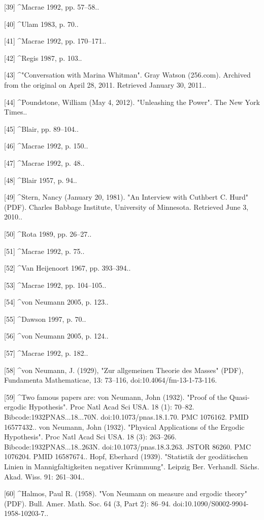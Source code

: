 [39]
^Macrae 1992, pp. 57–58..

[40]
^Ulam 1983, p. 70..

[41]
^Macrae 1992, pp. 170–171..

[42]
^Regis 1987, p. 103..

[43]
^"Conversation with Marina Whitman". Gray Watson (256.com). Archived from the original on April 28, 2011. Retrieved January 30, 2011..

[44]
^Poundstone, William (May 4, 2012). "Unleashing the Power". The New York Times..

[45]
^Blair, pp. 89–104..

[46]
^Macrae 1992, p. 150..

[47]
^Macrae 1992, p. 48..

[48]
^Blair 1957, p. 94..

[49]
^Stern, Nancy (January 20, 1981). "An Interview with Cuthbert C. Hurd" (PDF). Charles Babbage Institute, University of Minnesota. Retrieved June 3, 2010..

[50]
^Rota 1989, pp. 26–27..

[51]
^Macrae 1992, p. 75..

[52]
^Van Heijenoort 1967, pp. 393–394..

[53]
^Macrae 1992, pp. 104–105..

[54]
^von Neumann 2005, p. 123..

[55]
^Dawson 1997, p. 70..

[56]
^von Neumann 2005, p. 124..

[57]
^Macrae 1992, p. 182..

[58]
^von Neumann, J. (1929), "Zur allgemeinen Theorie des Masses" (PDF), Fundamenta Mathematicae, 13: 73–116, doi:10.4064/fm-13-1-73-116.

[59]
^Two famous papers are: von Neumann, John (1932). "Proof of the Quasi-ergodic Hypothesis". Proc Natl Acad Sci USA. 18 (1): 70–82. Bibcode:1932PNAS...18...70N. doi:10.1073/pnas.18.1.70. PMC 1076162. PMID 16577432.. von Neumann, John (1932). "Physical Applications of the Ergodic Hypothesis". Proc Natl Acad Sci USA. 18 (3): 263–266. Bibcode:1932PNAS...18..263N. doi:10.1073/pnas.18.3.263. JSTOR 86260. PMC 1076204. PMID 16587674.. Hopf, Eberhard (1939). "Statistik der geodätischen Linien in Mannigfaltigkeiten negativer Krümmung". Leipzig Ber. Verhandl. Sächs. Akad. Wiss. 91: 261–304..

[60]
^Halmos, Paul R. (1958). "Von Neumann on measure and ergodic theory" (PDF). Bull. Amer. Math. Soc. 64 (3, Part 2): 86–94. doi:10.1090/S0002-9904-1958-10203-7..

